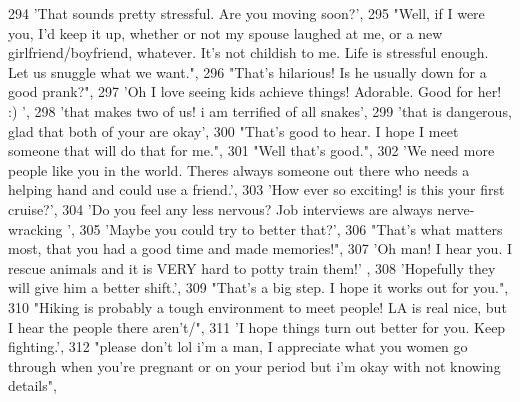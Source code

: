 \begin{DoxyCode}
294                             \textcolor{stringliteral}{'That sounds pretty stressful. Are you moving soon?'},
295                             \textcolor{stringliteral}{"Well, if I were you, I'd keep it up, whether or not my spouse laughed at me,
       or a new girlfriend/boyfriend, whatever. It's not childish to me. Life is stressful enough. Let us snuggle
       what we want."},
296                             \textcolor{stringliteral}{"That's hilarious! Is he usually down for a good prank?"},
297                             \textcolor{stringliteral}{'Oh I love seeing kids achieve things! Adorable. Good for her! :) '},
298                             \textcolor{stringliteral}{'that makes two of us! i am terrified of all snakes'},
299                             \textcolor{stringliteral}{'that is dangerous, glad that both of your are okay'},
300                             \textcolor{stringliteral}{"That's good to hear. I hope I meet someone that will do that for me."},
301                             \textcolor{stringliteral}{"Well that's good."},
302                             \textcolor{stringliteral}{'We need more people like you in the world.  Theres always someone out there
       who needs a helping hand and could use a friend.'},
303                             \textcolor{stringliteral}{'How ever so exciting! is this your first cruise?'},
304                             \textcolor{stringliteral}{'Do you feel any less nervous?  Job interviews are always nerve-wracking '},
305                             \textcolor{stringliteral}{'Maybe you could try to better that?'},
306                             \textcolor{stringliteral}{"That's what matters most, that you had a good time and made memories!"},
307                             \textcolor{stringliteral}{'Oh man! I hear you. I rescue animals and it is VERY hard to potty train them!'}
      ,
308                             \textcolor{stringliteral}{'Hopefully they will give him a better shift.'},
309                             \textcolor{stringliteral}{"That's a big step. I hope it works out for you."},
310                             \textcolor{stringliteral}{"Hiking is probably a tough environment to meet people! LA is real nice, but I
       hear the people there aren't/"},
311                             \textcolor{stringliteral}{'I hope things turn out better for you. Keep fighting.'},
312                             \textcolor{stringliteral}{"please don't lol i'm a man, I appreciate what you women go through when you're
       pregnant or on your period but i'm okay with not knowing details"},

\end{DoxyCode}
